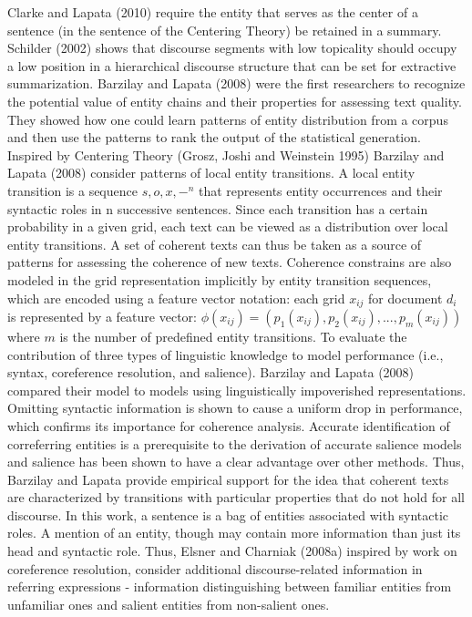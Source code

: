 Clarke and Lapata (2010) require the entity that serves as the center of a sentence (in the sentence of the Centering Theory) be retained in a summary. 
Schilder (2002) shows that discourse segments with low topicality should occupy a low position in a hierarchical discourse structure that can be set for extractive summarization. 
Barzilay and Lapata (2008) were the first researchers to recognize the potential value of entity chains and their properties for assessing text quality. 
They showed how one could learn patterns of entity distribution from a corpus and then use the patterns to rank the output of the statistical generation. 
Inspired by Centering Theory  (Grosz, Joshi and Weinstein 1995) Barzilay and Lapata (2008) consider patterns of local entity transitions. 
A local entity transition is a sequence ${s,o,x,-}^n$ that represents entity occurrences and their syntactic roles in n successive sentences. 
Since each transition has a certain probability in a given grid, each text can be viewed as a distribution over local entity transitions. 
A set of coherent texts can thus be taken as a source of patterns for assessing the coherence of new texts. 
Coherence constrains are also modeled in the grid representation implicitly by entity transition sequences, which are encoded using a feature vector notation: each grid $x_{ij}$ for document $d_i$ is represented by a feature vector:
$ \phi(x_{ij}) = (p_1(x_{ij}),p_2(x_{ij}),...,p_m(x_{ij}))$
where $m$ is the number of predefined entity transitions. 
To evaluate the contribution of three types of linguistic knowledge to model performance (i.e., syntax, coreference resolution, and salience). Barzilay and Lapata (2008) compared their model to models using linguistically impoverished representations. 
Omitting syntactic information is shown to cause a uniform drop in performance, which confirms its importance for coherence analysis. 
Accurate identification of correferring entities is a prerequisite to the derivation of accurate salience models and salience has been shown to have a clear advantage over other methods. 
Thus, Barzilay and Lapata provide empirical support for the idea that coherent texts are characterized by transitions with particular properties that do not hold for all discourse. 
In this work, a sentence is a bag of entities associated with syntactic roles. 
A mention of an entity, though may contain more information than just its head and syntactic role. 
Thus, Elsner and Charniak (2008a) inspired by work on coreference resolution, consider additional discourse-related information in referring expressions - information distinguishing between familiar entities from unfamiliar ones and salient entities from non-salient ones.   


